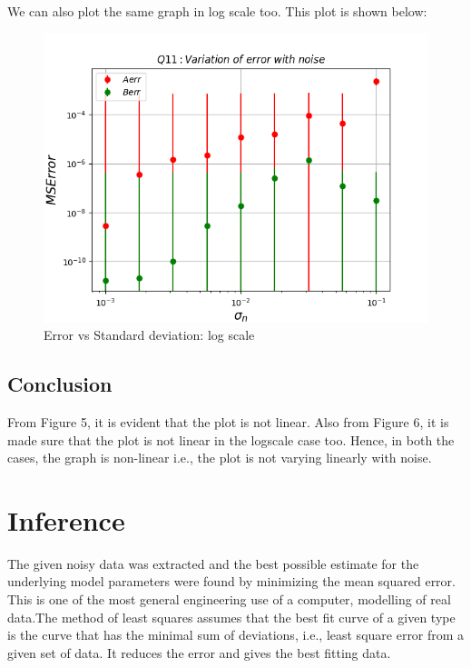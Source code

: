 \documentclass[11pt, a4paper]{article}
\begin{document}
We can also plot the same graph in log scale too. This plot is shown below:\\
 	\begin{figure}[!tbh]
   	\centering
   	\includegraphics[scale=0.6]{Figure_Q11.png}   
   	\caption{Error vs Standard deviation: log scale}
   	\label{fig:sample}
   \end{figure} 
\subsection*{Conclusion}
From Figure 5, it is evident that the plot is not linear. Also from Figure 6, it is made sure that the plot is not linear in the logscale case too. Hence, in both the cases, the graph is non-linear i.e., the plot is not varying linearly with noise. 

\section*{Inference}
The given noisy data was extracted and the best possible estimate for the
underlying model parameters were found by minimizing the mean squared
error. This is one of the most general engineering use of a computer, modelling of real data.The method of least squares assumes that the best fit curve of a given type is the curve that has the minimal sum of deviations, i.e., least square error from a given set of data. It reduces the error and gives the best fitting data.
 
\end{document}
